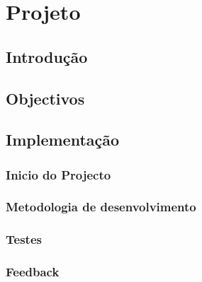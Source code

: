 \chapter{Projeto}
\label{cap4}

\section{Introdução}

\lipsum

\section{Objectivos}

\lipsum

\section{Implementação}

\subsection{Inicio do Projecto}

\lipsum

\subsection{Metodologia de desenvolvimento}

\lipsum

\subsection{Testes}

\lipsum

\subsection{Feedback}

\lipsum
